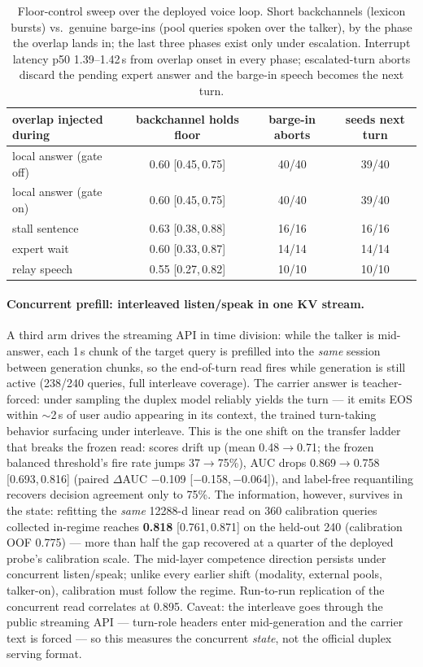 \begin{table}[h]
\centering\small
\begin{tabular}{lccc}
\toprule
overlap injected during & backchannel holds floor & barge-in aborts &
seeds next turn \\
\midrule
local answer (gate off) & 0.60 [0.45,\,0.75] & 40/40 & 39/40 \\
local answer (gate on)  & 0.60 [0.45,\,0.75] & 40/40 & 39/40 \\
stall sentence          & 0.63 [0.38,\,0.88] & 16/16 & 16/16 \\
expert wait             & 0.60 [0.33,\,0.87] & 14/14 & 14/14 \\
relay speech            & 0.55 [0.27,\,0.82] & 10/10 & 10/10 \\
\bottomrule
\end{tabular}
\caption{Floor-control sweep over the deployed voice loop. Short
backchannels (lexicon bursts) vs.\ genuine barge-ins (pool queries
spoken over the talker), by the phase the overlap lands in; the last
three phases exist only under escalation. Interrupt latency
p50 1.39--1.42\,s from overlap onset in every phase; escalated-turn
aborts discard the pending expert answer and the barge-in speech
becomes the next turn.}
\label{tab:floor}
\end{table}

\paragraph{Concurrent prefill: interleaved listen/speak in one KV
stream.} A third arm drives the streaming API in time division: while
the talker is mid-answer, each 1\,s chunk of the target query is
prefilled into the \emph{same} session between generation chunks, so
the end-of-turn read fires while generation is still active (238/240
queries, full interleave coverage). The carrier
answer is teacher-forced: under sampling the duplex model reliably
yields the turn --- it emits EOS within $\sim$2\,s of user audio
appearing in its context, the trained turn-taking behavior surfacing
under interleave. This is the one shift on the transfer ladder that
breaks the frozen read: scores drift up (mean 0.48$\to$0.71; the
frozen balanced threshold's fire rate jumps 37$\to$75\%), AUC drops
0.869$\to$0.758 [0.693,\,0.816] (paired $\Delta$AUC $-$0.109
[$-$0.158,\,$-$0.064]), and label-free requantiling recovers decision
agreement only to 75\%. The information, however, survives in the
state: refitting the \emph{same} 12288-d linear read on 360
calibration queries collected in-regime reaches \textbf{0.818}
[0.761,\,0.871] on the held-out 240 (calibration OOF 0.775) --- more
than half the gap recovered at a quarter of the deployed probe's
calibration scale. The mid-layer competence direction persists under
concurrent listen/speak; unlike every earlier shift (modality,
external pools, talker-on), calibration must follow the regime.
Run-to-run replication of the concurrent read correlates at 0.895.
Caveat: the interleave goes through the public streaming API ---
turn-role headers enter mid-generation and the carrier text is forced
--- so this measures the concurrent \emph{state}, not the official
duplex serving format.

